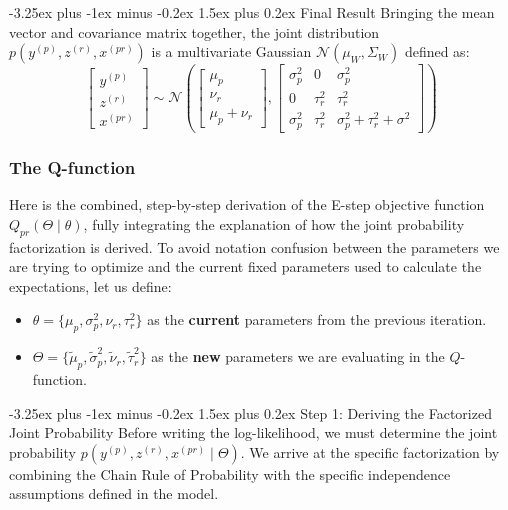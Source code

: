 \documentclass[twoside, 10pt]{article}
\makeatletter
\renewcommand{\paragraph}{\@startsection{paragraph}{4}{0pt}%
    {-3.25ex plus -1ex minus -0.2ex}%
    {1.5ex plus 0.2ex}%
    {\normalfont\normalsize\bfseries}}
\makeatother
\begin{document}
\paragraph{Final Result}
Bringing the mean vector and covariance matrix together, the joint distribution $p(y^{(p)}, z^{(r)}, x^{(pr)})$ is a multivariate Gaussian $\mathcal{N}(\mu_W, \Sigma_W)$ defined as:
\[
\begin{bmatrix} y^{(p)} \\ z^{(r)} \\ x^{(pr)} \end{bmatrix} \sim \mathcal{N} \left( \begin{bmatrix} \mu_p \\ \nu_r \\ \mu_p + \nu_r \end{bmatrix}, \begin{bmatrix} \sigma_p^2 & 0 & \sigma_p^2 \\ 0 & \tau_r^2 & \tau_r^2 \\ \sigma_p^2 & \tau_r^2 & \sigma_p^2 + \tau_r^2 + \sigma^2 \end{bmatrix} \right)
\]
\subsubsection{The Q-function}
Here is the combined, step-by-step derivation of the E-step objective function $Q_{pr}(\Theta \mid \theta)$, fully integrating the explanation of how the joint probability factorization is derived.
To avoid notation confusion between the parameters we are trying to optimize and the current fixed parameters used to calculate the expectations, let us define:
\begin{itemize}
    \item $\theta = \{\mu_p, \sigma_p^2, \nu_r, \tau_r^2\}$ as the \textbf{current} parameters from the previous iteration.
    \item $\Theta = \{\tilde{\mu}_p, \tilde{\sigma}_p^2, \tilde{\nu}_r, \tilde{\tau}_r^2\}$ as the \textbf{new} parameters we are evaluating in the $Q$-function.
\end{itemize}
\paragraph{Step 1: Deriving the Factorized Joint Probability}
Before writing the log-likelihood, we must determine the joint probability $p(y^{(p)}, z^{(r)}, x^{(pr)} \mid \Theta)$. We arrive at the specific factorization by combining the Chain Rule of Probability with the specific independence assumptions defined in the model.
\end{document}
